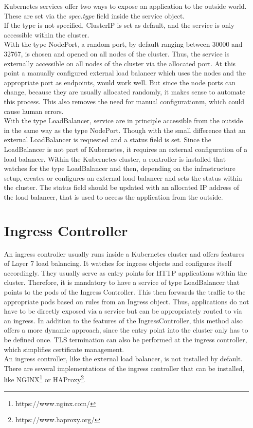 Kubernetes services offer two ways to expose an application to the outside world.
These are set via the \textit{spec.type} field inside the service object.
\\
If the type is not specified, ClusterIP is set as default, and the service is only accessible within the cluster.
\\
With the type NodePort, a random port, by default ranging between 30000 and 32767, is chosen and opened on all nodes of the cluster.
Thus, the service is externally accessible on all nodes of the cluster via the allocated port.
At this point a manually configured external load balancer which uses the nodes and the appropriate port as endpoints, would work well.
But since the node ports can change, because they are usually allocated randomly, it makes sense to automate this process. This also removes the need for manual configurationm, which could cause human errors.
\\
With the type LoadBalancer, service are in principle accessible from the outside in the same way as the type NodePort. Though with the small difference that an external LoadBalancer is requested and a status field is set.
Since the LoadBalancer is not part of Kubernetes, it requires an external configuration of a load balancer.
Within the Kubernetes cluster, a controller is installed that watches for the type LoadBalancer and then, depending on the infrastructure setup, creates or configures an external load balancer and sets the status within the cluster.
The status field should be updated with an allocated IP address of the load balancer, that is used to access the application from the outside.~\cite{KUBERNETES-SERVICE}

\section{Ingress Controller}\label{sec:IngressController}

An ingress controller usually runs inside a Kubernetes cluster and offers features of Layer 7 load balancing.
It watches for ingress objects and configures itself accordingly.
They usually serve as entry points for HTTP applications within the cluster.
Therefore, it is mandatory to have a service of type LoadBalancer that points to the pods of the Ingress Controller.
This then forwards the traffic to the appropriate pods based on rules from an Ingress object.
Thus, applications do not have to be directly exposed via a service but can be appropriately routed to via an ingress.
In addition to the features of the IngressController, this method also offers a more dynamic approach, since the entry point into the cluster only has to be defined once.
TLS termination can also be performed at the ingress controller, which simplifies certificate management.~\cite{KUBERNETES-INGRESS}
\\
An ingress controller, like the external load balancer, is not installed by default.
There are several implementations of the ingress controller that can be installed, like NGINX\footnote{https://www.nginx.com/} or HAProxy\footnote{https://www.haproxy.org/}.~\cite{KUBERNETES-INGRESS-CONTROLLER}

